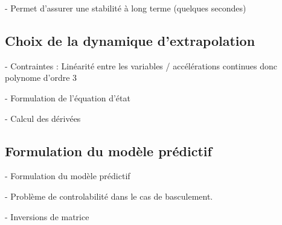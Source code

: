 			- Permet d'assurer une stabilité à long terme (quelques secondes)
		\subsection{Choix de la dynamique d'extrapolation}

			- Contraintes : Linéarité entre les variables / accélérations continues donc polynome d'ordre 3

			- Formulation de l'équation d'état

			- Calcul des dérivées

		\subsection{Formulation du modèle prédictif}

			- Formulation du modèle prédictif

			- Problème de controlabilité dans le cas de basculement.
			
			- Inversions de matrice